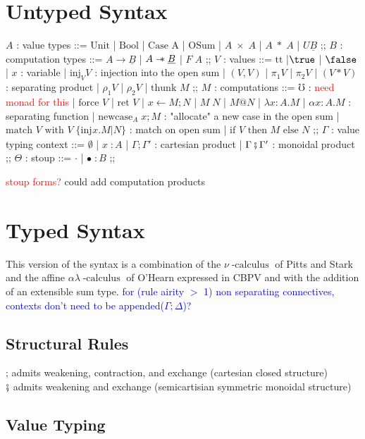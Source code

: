 \documentclass{article}
\makeatletter
\newcommand{\blue}[1]{\textcolor{blue}{#1}}
\newcommand{\red}[1]{\textcolor{red}{#1}}
\newcommand{\sep}{\mathrel{-\mkern-6mu*}}
\newcommand{\thunk}[1]{\textrm{thunk }#1}
\newcommand{\injj}[2]{\textrm{inj}_{#1}#2}
\newcommand{\err}{\mho}
\newcommand{\force}[1]{\textrm{force }#1}
\newcommand{\ret}[1]{\textrm{ret }#1}
\newcommand{\bind}[3]{#1 \leftarrow #2 ; #3}
\newcommand{\newcase}[3]{\textrm{newcase}_{#1} \; #2 ; #3}
\newcommand{\match}[5]{\textrm{match }#1 \textrm{ with }#2 \;\{#3 . #4 | #5\}}
\newcommand{\lett}[4]{\textrm{let }(#1,#2) = #3 ; #4}
\newcommand{\lets}[4]{\textrm{let }(#1*#2) = #3 ; #4}
\newcommand{\ite}[3]{\textrm{if }#1 \textrm{ then }#2 \textrm{ else }#3}
\newcommand{\at}{\textrm{@}}
\newcommand{\ttt}{\textrm{tt}}
\newcommand{\calculus}{\operatorname{-calculus}}
\makeatother
\begin{document}
\section{Untyped Syntax}
\begin{bnf}
$A$ : value types ::= $\textrm{Unit}$
| $\textrm{Bool}$
| $\textrm{Case A}$ 
| $\textrm{OSum}$
| $A\; \times \; A$  
| $A\; * \; A$
| $U\underline{B}$
;;
$B$ : computation types ::= $A \rightarrow \underline{B}$ 
| $A \sep \underline{B}$
| $F\;A$
;;
$V$ : values ::= $\ttt$
|$\true$
| $\false$
| $x$ : variable
| $\injj{V}{V}$ : injection into the open sum
| $(V,V)$
| $\pi_1 V$
| $\pi_2 V$
| $(V*V)$ : separating product
| $\rho_1 V$
| $\rho_2 V$
| $\thunk{M}$
;;
$M$ : computations ::= $\err$ : \red{need monad for this}
| $\force{V}$
| $\ret{V}$
| $\bind{x}{M}{N}$
| $M \; N$
| $M \at N$
| $\lambda x \colon A . M$
| $\alpha x \colon A . M$ : separating function
| $\newcase{A}{x}{M}$ : "allocate" a new case in the open sum
| $\match{V}{V}{\injj{}{x}}{M}{N}$ : match on open sum
| $\ite{V}{M}{N}$
;;
$\Gamma$ : value typing context ::= $\emptyset$ 
| $ x \; \colon A$
| $\Gamma ; \Gamma'$ : cartesian product
| $\Gamma \fatsemi \Gamma'$ : monoidal product
;;
$\Theta$ : stoup ::= $\cdot$ 
| $\bullet \; \colon B$
;;
\end{bnf}
\red{stoup forms?} could add computation products
\begin{comment}
    | $\lett{x}{y}{V}{M}$
| $\lets{x}{y}{V}{M}$
\end{comment}

\newpage
\section{Typed Syntax}
This version of the syntax is a combination of the $\nu\calculus$\cite{stark:namerp-tlca}
\cite{starkCategoricalModelsLocal1996} of Pitts and Stark and the affine $\alpha\lambda\calculus$ of O'Hearn 
\cite{ohearnResourceInterpretationsBunched1999} expressed in CBPV and with the addition of an extensible sum type.
\blue{for (rule airity $>$ 1) non separating connectives, contexts don't need to be appended($\Gamma ; \Delta$)?}
\subsection{Structural Rules}
; admits weakening, contraction, and exchange (cartesian closed structure)\\
$\fatsemi$ admits weakening and exchange (semicartisian symmetric monoidal structure)
\subsection{Value Typing}
\end{document}
